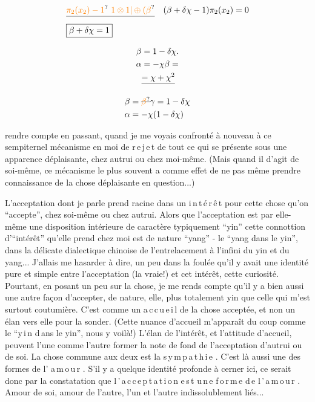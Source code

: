 \[
\begin{aligned}
&\deleted{\unsure{\pi_2(x_2)-1}\ \unsure{1\otimes1|\oplus(\beta}}\quad(\beta+\delta\chi-1)\pi_2(x_2)=0\\
&\boxed{\beta+\delta\chi=1}
\end{aligned}
\]

\[
\begin{aligned}\beta&=1-\delta\chi.\\
\alpha&=-\chi\beta=\\ &\deleted{=\chi+\chi^2}\end{aligned}
\]

\[
\begin{aligned}\beta&=\deleted{\unsure{\beta}}\gamma=1-\delta\chi\\
\alpha&=-\chi(1-\delta\chi)\end{aligned}
\]

rendre compte en passant, quand je me voyais confronté à nouveau à ce sempiternel mécanisme en moi de r\,e\,j\,e\,t de tout ce qui se présente sous une apparence déplaisante, chez autrui ou chez moi-même. (Mais quand il d'agit de soi-même, ce mécanisme le plus souvent a comme effet de ne pas même prendre connaissance de la chose déplaisante en question...)

L'acceptation dont je parle prend racine dans un i\,n\,t\,é\,r\,ê\,t pour cette chose qu'on ``accepte'', chez soi-même ou chez autrui. Alors que l'acceptation est par elle-même une disposition intérieure de caractère typiquement ``yin''\unsure{:|,} cette connottion d'``intérêt'' qu'elle prend chez moi est de nature ``yang'' -  le ``yang dans le yin'', dans la délicate dialectique chinoise de l'entrelacement à l'infini du yin et du yang... J'allais me hasarder à dire, un peu dans la foulée\handwritten{,} qu'il y avait une identité pure et simple entre l'acceptation (la vraie!) et cet intérêt, cette curiosité. Pourtant, en posant un peu sur la chose, je me rends compte qu'il y a bien aussi une autre façon d'accepter, de nature, elle, plus totalement yin que celle qui m'est surtout coutumière. C'est comme un a\,c\,c\,u\,e\,i\,l de la chose acceptée, et non un élan vers elle pour la sonder. (Cette nuance d'accueil m'apparaît du coup comme le ``y\,i\,n d\,ans le yin'', nous y voilà!) L'élan de l'intérêt, et l'attitude d'accueil, peuvent l'une comme l'autre former la note de fond de l'acceptation d'autrui ou de soi. La chose commune aux deux est la s\,y\,m\,p\,a\,t\,h\,i\,e . C'est là aussi une des formes de l' a\,m\,o\,u\,r . S'il y a quelque identité profonde à cerner ici, ce serait donc par la constatation que l\,'\,a\,c\,c\,e\,p\,t\,a\,t\,i\,o\,n e\,s\,t u\,n\,e f\,o\,r\,m\,e d\,e l\,'\,a\,m\,o\,u\,r . Amour de soi, amour de l'autre, l'un et l'autre indissolublement liés...

